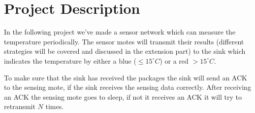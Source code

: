 \section{Project Description}

In the following project we've made a sensor network which can measure the
temperature periodically. The sensor motes will transmit their results
(different strategies will be covered and discussed in the extension part) to
the sink which indicates the temperature by either a blue ($\leq 15^{\circ} C
$) or a red $>15^{\circ} C$.

To make sure that the sink has received the packages the sink will send an ACK
to the sensing mote, if the sink receives the sensing data correctly. After
receiving an ACK the sensing mote goes to sleep, if not it receives an ACK it
will try to retransmit $N$ times.

